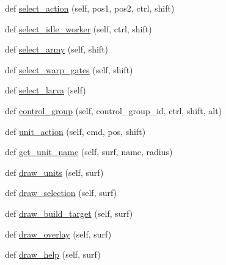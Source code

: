 \begin{DoxyCompactItemize}
def \mbox{\hyperlink{classpysc2_1_1lib_1_1renderer__human_1_1_renderer_human_a5a02cefce3f1fd80ce6f5d018aa63ae1}{select\+\_\+action}} (self, pos1, pos2, ctrl, shift)
\item 
def \mbox{\hyperlink{classpysc2_1_1lib_1_1renderer__human_1_1_renderer_human_af24db9de7cefaf79d4e3304451874971}{select\+\_\+idle\+\_\+worker}} (self, ctrl, shift)
\item 
def \mbox{\hyperlink{classpysc2_1_1lib_1_1renderer__human_1_1_renderer_human_a44ccbd5f0a7ca4f3bf4d8d99d1f359db}{select\+\_\+army}} (self, shift)
\item 
def \mbox{\hyperlink{classpysc2_1_1lib_1_1renderer__human_1_1_renderer_human_ab22c464f134f2776764bd490510d7625}{select\+\_\+warp\+\_\+gates}} (self, shift)
\item 
def \mbox{\hyperlink{classpysc2_1_1lib_1_1renderer__human_1_1_renderer_human_a523b4748b3d7d3140444a28d210c6ffa}{select\+\_\+larva}} (self)
\item 
def \mbox{\hyperlink{classpysc2_1_1lib_1_1renderer__human_1_1_renderer_human_aee87eb12a9bd8b68cda51b5fc9ddc179}{control\+\_\+group}} (self, control\+\_\+group\+\_\+id, ctrl, shift, alt)
\item 
def \mbox{\hyperlink{classpysc2_1_1lib_1_1renderer__human_1_1_renderer_human_ad2533c429123e8b01182751705656831}{unit\+\_\+action}} (self, cmd, pos, shift)
\item 
def \mbox{\hyperlink{classpysc2_1_1lib_1_1renderer__human_1_1_renderer_human_ae85499fb46248e23a7a6fdcd71c576a1}{get\+\_\+unit\+\_\+name}} (self, surf, name, radius)
\item 
def \mbox{\hyperlink{classpysc2_1_1lib_1_1renderer__human_1_1_renderer_human_ade68e7bc9d5713cdbff1ff7e905e2550}{draw\+\_\+units}} (self, surf)
\item 
def \mbox{\hyperlink{classpysc2_1_1lib_1_1renderer__human_1_1_renderer_human_ab54385cd728e583992e54234775d64f2}{draw\+\_\+selection}} (self, surf)
\item 
def \mbox{\hyperlink{classpysc2_1_1lib_1_1renderer__human_1_1_renderer_human_ac5a4bf8e1bd71c179bbea141b63b0f73}{draw\+\_\+build\+\_\+target}} (self, surf)
\item 
def \mbox{\hyperlink{classpysc2_1_1lib_1_1renderer__human_1_1_renderer_human_aeeda39dd88a95065aa09e5e42607f8f1}{draw\+\_\+overlay}} (self, surf)
\item 
def \mbox{\hyperlink{classpysc2_1_1lib_1_1renderer__human_1_1_renderer_human_ae2b5b91b3849a464443dc7b9a8753972}{draw\+\_\+help}} (self, surf)
\item 

\end{DoxyCompactItemize}
